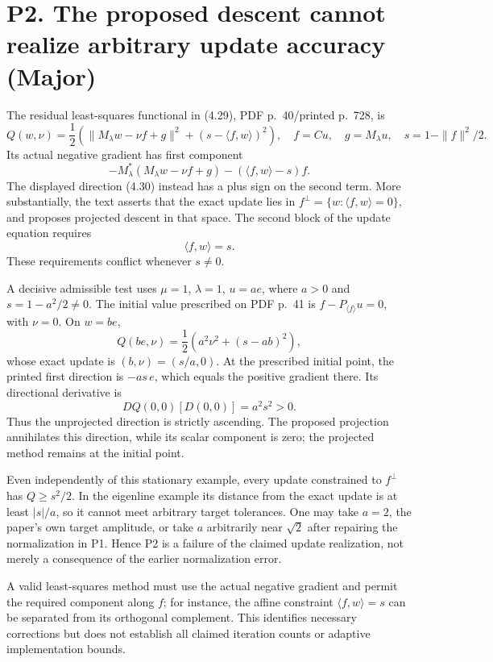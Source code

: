 \documentclass[10pt]{article}
\begin{document}
\section*{P2. The proposed descent cannot realize arbitrary update accuracy (Major)}
The residual least-squares functional in (4.29), PDF p. 40/printed p. 728, is \[Q(w,\nu)=\frac12\left(\|M_\lambda w-\nu f+g\|^2
 +(s-\langle f,w\rangle)^2\right),
\quad f=Cu,\quad g=M_\lambda u,\quad s=1-\|f\|^2/2.\] Its actual negative gradient has first component \[-M_\lambda^*(M_\lambda w-\nu f+g)
 -(\langle f,w\rangle-s)f.\] The displayed direction (4.30) instead has a plus sign on the second term. More substantially, the text asserts that the exact update lies in \(f^\perp=\{w:\langle f,w\rangle=0\}\), and proposes projected descent in that space. The second block of the update equation requires \[\langle f,w\rangle=s.\] These requirements conflict whenever \(s\ne0\).\par
A decisive admissible test uses \(\mu=1\), \(\lambda=1\), \(u=ae\), where \(a>0\) and \(s=1-a^2/2\ne0\). The initial value prescribed on PDF p. 41 is \(f-P_{\langle f\rangle}u=0\), with \(\nu=0\). On \(w=be\), \[Q(be,\nu)=\frac12\left(a^2\nu^2+(s-ab)^2\right),\] whose exact update is \((b,\nu)=(s/a,0)\). At the prescribed initial point, the printed first direction is \(-as\,e\), which equals the positive gradient there. Its directional derivative is \[DQ(0,0)[D(0,0)]=a^2s^2>0.\] Thus the unprojected direction is strictly ascending. The proposed projection annihilates this direction, while its scalar component is zero; the projected method remains at the initial point.\par
Even independently of this stationary example, every update constrained to \(f^\perp\) has \(Q\ge s^2/2\). In the eigenline example its distance from the exact update is at least \(|s|/a\), so it cannot meet arbitrary target tolerances. One may take \(a=2\), the paper’s own target amplitude, or take \(a\) arbitrarily near \(\sqrt2\) after repairing the normalization in P1. Hence P2 is a failure of the claimed update realization, not merely a consequence of the earlier normalization error.\par
A valid least-squares method must use the actual negative gradient and permit the required component along \(f\); for instance, the affine constraint \(\langle f,w\rangle=s\) can be separated from its orthogonal complement. This identifies necessary corrections but does not establish all claimed iteration counts or adaptive implementation bounds.\par
\end{document}
